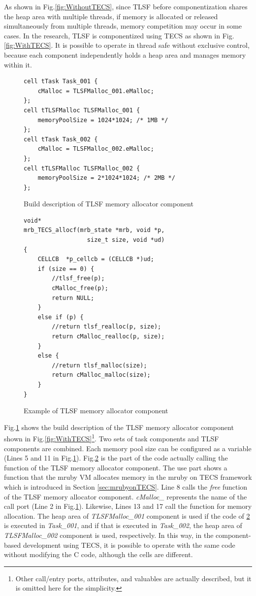 \documentclass[a4j,12pt,oneside,openany,english]{jsbook}
\begin{document}
As shown in Fig.\ref{fig:WithoutTECS}, since TLSF before componentization shares the heap area with multiple threads, if memory is allocated or released simultaneously from multiple threads, memory competition may occur in some cases.
In the research, TLSF is componentized using TECS as shown in Fig.\ref{fig:WithTECS}.
It is possible to operate in thread safe without exclusive control, because each component independently holds a heap area and manages memory within it. 

\begin{figure}[t]
\centering
\begin{lstlisting}
cell tTask Task_001 {
    cMalloc = TLSFMalloc_001.eMalloc;
};
cell tTLSFMalloc TLSFMalloc_001 {
    memoryPoolSize = 1024*1024; /* 1MB */
};
cell tTask Task_002 {
    cMalloc = TLSFMalloc_002.eMalloc;
};
cell tTLSFMalloc TLSFMalloc_002 {
    memoryPoolSize = 2*1024*1024; /* 2MB */
};
\end{lstlisting}
\caption{Build description of TLSF memory allocator component}
\label{src:TLSFBuild}
\end{figure}


\begin{figure}[t]
\centering
\begin{lstlisting}
void*
mrb_TECS_allocf(mrb_state *mrb, void *p, 
                  size_t size, void *ud)
{
    CELLCB	*p_cellcb = (CELLCB *)ud;
    if (size == 0) {
        //tlsf_free(p);
        cMalloc_free(p);
        return NULL;
    }
    else if (p) {
        //return tlsf_realloc(p, size);
        return cMalloc_realloc(p, size);
    }
    else {
        //return tlsf_malloc(size);
        return cMalloc_malloc(size);
    }
}
\end{lstlisting}
\caption{Example of TLSF memory allocator component}  
\label{src:TLSFC}
\end{figure}

Fig.\ref{src:TLSFBuild} shows the build description of the TLSF memory allocator component shown in Fig.\ref{fig:WithTECS}\footnote{Other call/entry ports, attributes, and valuables are actually described, but it is omitted here for the simplicity.}.
Two sets of task components and TLSF components are combined.
Each memory pool size can be configured as a variable (Lines 5 and 11 in Fig.\ref{src:TLSFBuild}).
Fig.\ref{src:TLSFC} is the part of the code actually calling the function of the TLSF memory allocator component.
The use part shows a function that the mruby VM allocates memory in the mruby on TECS framework\cite{par:mrubyonTECS}\cite{par:mrubyonTECS3} which is introduced in Section \ref{sec:mrubyonTECS}.
Line 8 calls the {\it free} function of the TLSF memory allocator component.
{\it cMalloc\_} represents the name of the call port (Line 2 in Fig.\ref{src:TLSFBuild}).
Likewise, Lines 13 and 17 call the function for memory allocation.
The heap area of {\it TLSFMalloc\_001} component is used if the code of \ref{src:TLSFC} is executed in {\it Task\_001}, and if that is executed in {\it Task\_002}, the heap area of {\it TLSFMalloc\_002} component is used, respectively.
In this way, in the component-based development using TECS, it is possible to operate with the same code without modifying the C code, although the cells are different.
\end{document}
